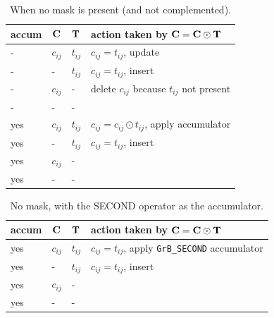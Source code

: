 \begin{table}[h]
\begin{center}
{\small
\begin{tabular}{lll|l}
\hline
       accum & ${\bf C}$ & ${\bf T}$        & action taken by ${\bf C = C \odot T}$ \\
\hline
        -   & $c_{ij}$ & $t_{ij}$         &  $c_{ij} = t_{ij}$, update \\
        -   &  -       & $t_{ij}$         &  $c_{ij} = t_{ij}$, insert \\
        -   & $c_{ij}$ &  -               &  delete $c_{ij}$ because $t_{ij}$ not present \\
        -   &  -       &  -               &   \\
\hline
        yes & $c_{ij}$ & $t_{ij}$         &  $c_{ij} = c_{ij} \odot t_{ij}$, apply accumulator \\
        yes &  -       & $t_{ij}$         &  $c_{ij} = t_{ij}$, insert \\
        yes & $c_{ij}$ &  -               &   \\
        yes &  -       &  -               &   \\
\hline
\end{tabular}
}
\caption{When no mask is present (and not complemented).
\label{tab:maskaccum_nomask}}
\end{center}
\end{table}

\begin{table}[h]
\begin{center}
{\small
\begin{tabular}{lll|l}
\hline
       accum & ${\bf C}$ & ${\bf T}$        & action taken by ${\bf C = C \odot T}$ \\
\hline
        yes & $c_{ij}$ & $t_{ij}$         &  $c_{ij} = t_{ij}$, apply \verb'GrB_SECOND' accumulator \\
        yes &  -       & $t_{ij}$         &  $c_{ij} = t_{ij}$, insert \\
        yes & $c_{ij}$ &  -               &   \\
        yes &  -       &  -               &   \\
\hline
\end{tabular}
}
\caption{No mask, with the SECOND operator as the accumulator.
\label{tab:maskaccum_nomask_2nd}}
\end{center}
\end{table}

